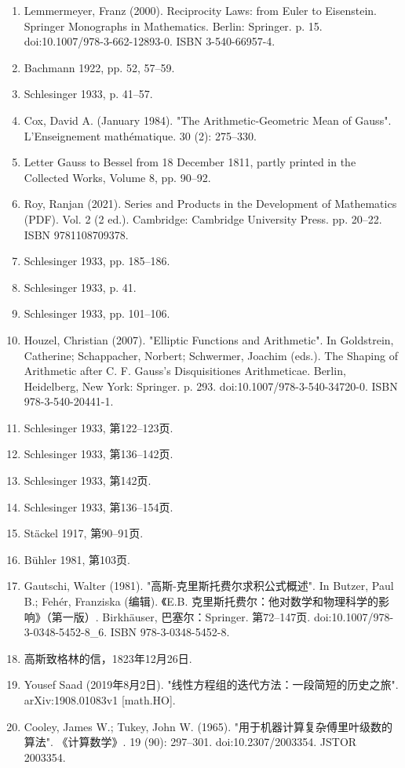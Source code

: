 \begin{enumerate}
\item Lemmermeyer, Franz (2000). Reciprocity Laws: from Euler to Eisenstein. Springer Monographs in Mathematics. Berlin: Springer. p. 15. doi:10.1007/978-3-662-12893-0. ISBN 3-540-66957-4.
\item Bachmann 1922, pp. 52, 57–59.
\item Schlesinger 1933, p. 41–57.
\item Cox, David A. (January 1984). "The Arithmetic-Geometric Mean of Gauss". L'Enseignement mathématique. 30 (2): 275–330.
\item Letter Gauss to Bessel from 18 December 1811, partly printed in the Collected Works, Volume 8, pp. 90–92.
\item Roy, Ranjan (2021). Series and Products in the Development of Mathematics (PDF). Vol. 2 (2 ed.). Cambridge: Cambridge University Press. pp. 20–22. ISBN 9781108709378.
\item Schlesinger 1933, pp. 185–186.
\item Schlesinger 1933, p. 41.
\item Schlesinger 1933, pp. 101–106.
\item Houzel, Christian (2007). "Elliptic Functions and Arithmetic". In Goldstrein, Catherine; Schappacher, Norbert; Schwermer, Joachim (eds.). The Shaping of Arithmetic after C. F. Gauss's Disquisitiones Arithmeticae. Berlin, Heidelberg, New York: Springer. p. 293. doi:10.1007/978-3-540-34720-0. ISBN 978-3-540-20441-1.
\item Schlesinger 1933, 第122–123页.  
\item Schlesinger 1933, 第136–142页.  
\item Schlesinger 1933, 第142页.  
\item Schlesinger 1933, 第136–154页.  
\item Stäckel 1917, 第90–91页.  
\item Bühler 1981, 第103页.  
\item Gautschi, Walter (1981). "高斯-克里斯托费尔求积公式概述". In Butzer, Paul B.; Fehér, Franziska (编辑). 《E.B. 克里斯托费尔：他对数学和物理科学的影响》（第一版）. Birkhäuser, 巴塞尔：Springer. 第72–147页. doi:10.1007/978-3-0348-5452-8_6. ISBN 978-3-0348-5452-8.  
\item 高斯致格林的信，1823年12月26日.  
\item Yousef Saad (2019年8月2日). "线性方程组的迭代方法：一段简短的历史之旅". arXiv:1908.01083v1 [math.HO].  
\item Cooley, James W.; Tukey, John W. (1965). "用于机器计算复杂傅里叶级数的算法". 《计算数学》. 19 (90): 297–301. doi:10.2307/2003354. JSTOR 2003354.  

\end{enumerate}
